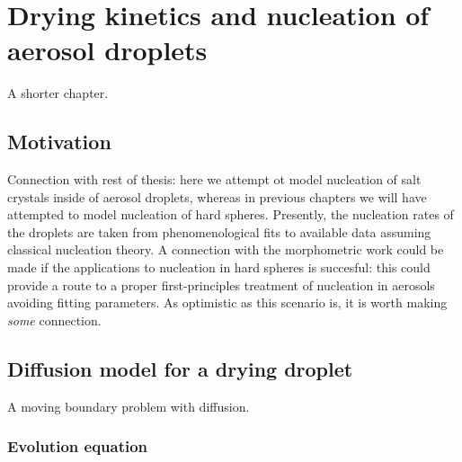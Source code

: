 \documentclass[12pt]{report}
\begin{document}
\chapter{Drying kinetics and nucleation of aerosol droplets}
A shorter chapter.

\section{Motivation}
Connection with rest of thesis: here we attempt ot model nucleation of salt crystals inside of aerosol droplets, whereas in previous chapters we will have attempted to model nucleation of hard spheres.
Presently, the nucleation rates of the droplets are taken from phenomenological fits to available data assuming classical nucleation theory.
A connection with the morphometric work could be made if the applications to nucleation in hard spheres is succesful: this could provide a route to a proper first-principles treatment of nucleation in aerosols avoiding fitting parameters.
As optimistic as this scenario is, it is worth making \emph{some} connection.

\section{Diffusion model for a drying droplet}
A moving boundary problem with diffusion.

\subsection{Evolution equation}
\end{document}
